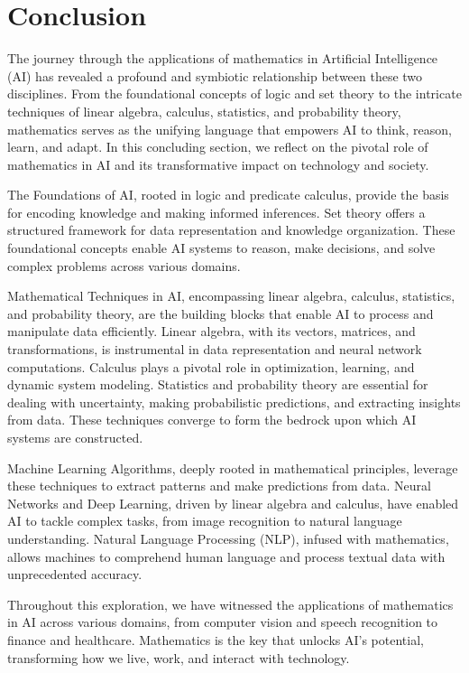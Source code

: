 \documentclass[conference]{IEEEtran}
\begin{document}
\section{Conclusion}

The journey through the applications of mathematics in Artificial Intelligence (AI) has revealed a profound and symbiotic relationship between these two disciplines. From the foundational concepts of logic and set theory to the intricate techniques of linear algebra, calculus, statistics, and probability theory, mathematics serves as the unifying language that empowers AI to think, reason, learn, and adapt. In this concluding section, we reflect on the pivotal role of mathematics in AI and its transformative impact on technology and society.

The Foundations of AI, rooted in logic and predicate calculus, provide the basis for encoding knowledge and making informed inferences. Set theory offers a structured framework for data representation and knowledge organization. These foundational concepts enable AI systems to reason, make decisions, and solve complex problems across various domains.

Mathematical Techniques in AI, encompassing linear algebra, calculus, statistics, and probability theory, are the building blocks that enable AI to process and manipulate data efficiently. Linear algebra, with its vectors, matrices, and transformations, is instrumental in data representation and neural network computations. Calculus plays a pivotal role in optimization, learning, and dynamic system modeling. Statistics and probability theory are essential for dealing with uncertainty, making probabilistic predictions, and extracting insights from data. These techniques converge to form the bedrock upon which AI systems are constructed.

Machine Learning Algorithms, deeply rooted in mathematical principles, leverage these techniques to extract patterns and make predictions from data. Neural Networks and Deep Learning, driven by linear algebra and calculus, have enabled AI to tackle complex tasks, from image recognition to natural language understanding. Natural Language Processing (NLP), infused with mathematics, allows machines to comprehend human language and process textual data with unprecedented accuracy.

Throughout this exploration, we have witnessed the applications of mathematics in AI across various domains, from computer vision and speech recognition to finance and healthcare. Mathematics is the key that unlocks AI's potential, transforming how we live, work, and interact with technology.
\end{document}

